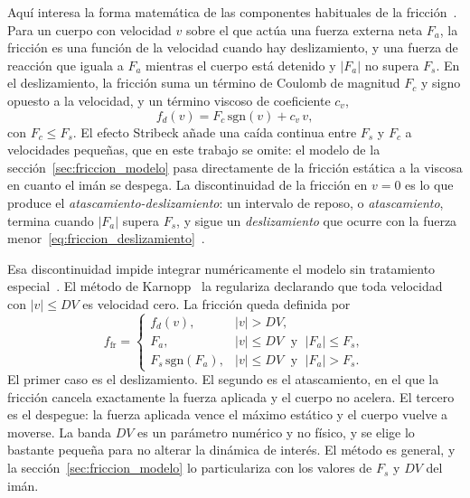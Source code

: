 Aquí interesa la forma matemática de las componentes habituales de la fricción~\cite{olsson,armstrong}. Para un cuerpo con velocidad $v$ sobre el que actúa una fuerza externa neta $F_a$, la fricción es una función de la velocidad cuando hay deslizamiento, y una fuerza de reacción que iguala a $F_a$ mientras el cuerpo está detenido y $|F_a|$ no supera $F_s$. En el deslizamiento, la fricción suma un término de Coulomb de magnitud $F_c$ y signo opuesto a la velocidad, y un término viscoso de coeficiente $c_v$,
\begin{equation}
f_d(v)=F_c\,\mathrm{sgn}(v)+c_v\,v ,
\label{eq:friccion_deslizamiento}
\end{equation}
con $F_c\le F_s$. El efecto Stribeck añade una caída continua entre $F_s$ y $F_c$ a velocidades pequeñas, que en este trabajo se omite: el modelo de la sección~\ref{sec:friccion_modelo} pasa directamente de la fricción estática a la viscosa en cuanto el imán se despega. La discontinuidad de la fricción en $v=0$ es lo que produce el \emph{atascamiento-deslizamiento}: un intervalo de reposo, o \emph{atascamiento}, termina cuando $|F_a|$ supera $F_s$, y sigue un \emph{deslizamiento} que ocurre con la fuerza menor~\eqref{eq:friccion_deslizamiento}~\cite{berman,armstrong}.

Esa discontinuidad impide integrar numéricamente el modelo sin tratamiento especial~\cite{haessig}. El método de Karnopp~\cite{karnopp} la regulariza declarando que toda velocidad con $|v|\le DV$ es velocidad cero. La fricción queda definida por
\begin{equation}
f_{\text{fr}} =
\begin{cases}
f_d(v), & |v|>DV, \\
F_a, & |v|\le DV \;\text{ y }\; |F_a|\le F_s, \\
F_s\,\mathrm{sgn}(F_a), & |v|\le DV \;\text{ y }\; |F_a|>F_s .
\end{cases}
\label{eq:karnopp}
\end{equation}
El primer caso es el deslizamiento. El segundo es el atascamiento, en el que la fricción cancela exactamente la fuerza aplicada y el cuerpo no acelera. El tercero es el despegue: la fuerza aplicada vence el máximo estático y el cuerpo vuelve a moverse. La banda $DV$ es un parámetro numérico y no físico, y se elige lo bastante pequeña para no alterar la dinámica de interés. El método es general, y la sección~\ref{sec:friccion_modelo} lo particulariza con los valores de $F_s$ y $DV$ del imán.

